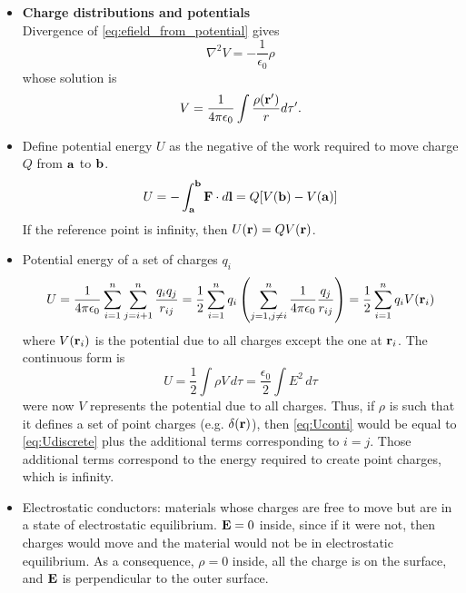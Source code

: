 \documentclass[11pt]{article}
\begin{document}
\begin{itemize}
\item \textbf{Charge distributions and potentials}\\
Divergence of \cref{eq:efield_from_potential} gives
\begin{equation}
\nabla^2 V = - \frac{1}{\epsilon_0} \rho
\end{equation}
whose solution is
\begin{equation}
V = \frac{1}{4 \pi \epsilon_0} \int \frac{\rho(\mathbf{r}')}{r} d\tau'.
\end{equation}

\item Define potential energy $U$ as the negative of the work required to move charge $Q$ from $\mathbf{a}$ to $\mathbf{b}$.
\begin{equation}
U = -\int_{\mathbf{a}}^{\mathbf{b}} \mathbf{F} \cdot d\mathbf{l} = Q [ V(\mathbf{b}) - V(\mathbf{a}) ]
\end{equation}
If the reference point is infinity, then $U(\mathbf{r}) = Q V(\mathbf{r})$.

\item Potential energy of a set of charges $q_i$ 
\begin{equation}
\label{eq:Udiscrete}
U = \frac{1}{4 \pi \epsilon_0} \sum^n_{i=1} \sum^n_{j = i+1} \frac{q_i q_j}{r_{ij}} = \frac{1}{2} \sum_{i=1}^{n} q_i \left ( \sum_{j = 1, j \ne i}^{n} \frac{1}{4 \pi \epsilon_0} \frac{q_j}{r_{ij}} \right ) = \frac{1}{2} \sum_{i=1}^{n} q_i V(\mathbf{r}_i)
\end{equation}
where $V(\mathbf{r}_i)$ is the potential due to all charges except the one at $\mathbf{r}_i$. The continuous form is
\begin{equation}
\label{eq:Uconti}
U = \frac{1}{2} \int \rho V \, d\tau = \frac{\epsilon_0}{2} \int E^2 \, d\tau
\end{equation}
were now $V$ represents the potential due to all charges. Thus, if $\rho$ is such that it defines a set of point charges (e.g. $\delta(\mathbf{r})$), then \cref{eq:Uconti} would be equal to \cref{eq:Udiscrete} plus the additional terms corresponding to $i=j$. Those additional terms correspond to the energy required to create point charges, which is infinity. 

\item Electrostatic conductors: materials whose charges are free to move but are in a state of electrostatic equilibrium. $\mathbf{E} = 0$ inside, since if it were not, then charges would move and the material would not be in electrostatic equilibrium. As a consequence, $\rho = 0$ inside, all the charge is on the surface, and $\mathbf{E}$ is perpendicular to the outer surface.


\end{itemize}
\end{document}
